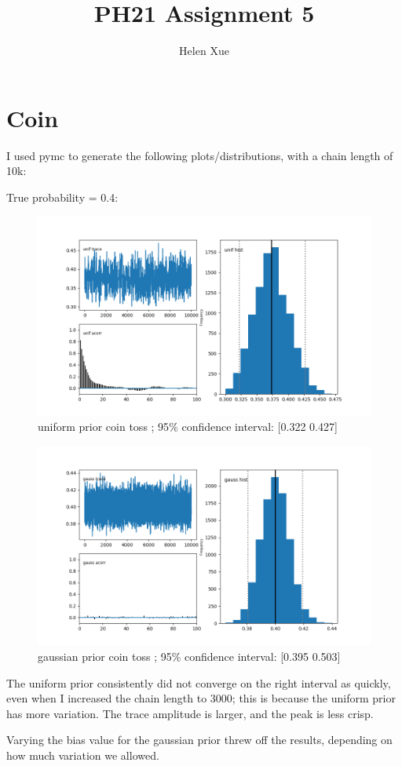 \documentclass[a4paper,11pt,english]{article}
\title{PH21 Assignment 5}
\author{Helen Xue}
\begin{document}
\maketitle


\section{Coin}
\par I used pymc to generate the following plots/distributions, with a chain length of 10k:
\par True probability = 0.4:
\begin{figure}[H]

	\includegraphics[width=\linewidth]{coin/unif}
	uniform prior coin toss ;   95$\%$ confidence interval: [0.322 0.427]
	
	\includegraphics[width=\linewidth]{coin/gauss}
	gaussian prior coin toss ;  95$\%$ confidence interval: [0.395 0.503]
\end{figure}

\par The uniform prior consistently did not converge on the right interval as quickly, even when I increased the chain length to 3000; this is because the uniform prior has more variation.  The trace amplitude is larger, and the peak is less crisp.
\par Varying the bias value for the gaussian prior threw off the results, depending on how much variation we allowed.
\end{document}
